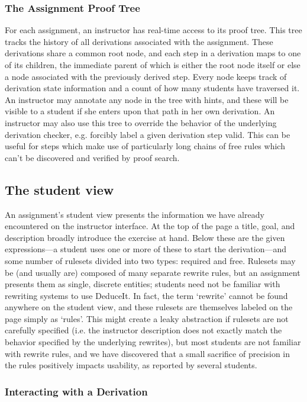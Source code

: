 \documentclass{sigchi}
\begin{document}
\subsubsection{The Assignment Proof Tree}

For each assignment, an instructor has real-time access to its proof tree. This tree tracks the history of all derivations associated with the assignment. These derivations share a common root node, and each step in a derivation maps to one of its children, the immediate parent of which is either the root node itself or else a node associated with the previously derived step. Every node keeps track of derivation state information and a count of how many students have traversed it. An instructor may annotate any node in the tree with hints, and these will be visible to a student if she enters upon that path in her own derivation. An instructor may also use this tree to override the behavior of the underlying derivation checker, e.g. forcibly label a given derivation step valid. This can be useful for steps which make use of particularly long chains of free rules which can't be discovered and verified by proof search.


\subsection{The student view}

An assignment's student view presents the information we have already encountered on the instructor interface. At the top of the page a title, goal, and description broadly introduce the exercise at hand. Below these are the given expressions---a student uses one or more of these to start the derivation---and some number of rulesets divided into two types: required and free. Rulesets may be (and usually are) composed of many separate rewrite rules, but an assignment presents them as single, discrete entities; students need not be familiar with rewriting systems to use DeduceIt. In fact, the term `rewrite' cannot be found anywhere on the student view, and these rulesets are themselves labeled on the page simply as `rules'. This might create a leaky abstraction if rulesets are not carefully specified (i.e. the instructor description does not exactly match the behavior specified by the underlying rewrites), but most students are not familiar with rewrite rules, and we have discovered that a small sacrifice of precision in the rules positively impacts usability, as reported by several students.

\subsubsection{Interacting with a Derivation}
\end{document}
